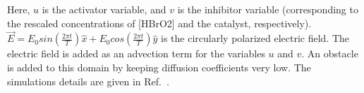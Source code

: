 Here, $u$ is the activator variable, and $v$ is the inhibitor variable (corresponding to the rescaled concentrations of [HBrO2] and the catalyst, respectively). $\vec{E} = E_{0} sin(\frac{2\pi t}{T})\hat{x} + E_{0} cos(\frac{2\pi t}{T})\hat{y}$ is the circularly polarized electric field. The electric field is added as an advection term for the variables $u$ and $v$. An obstacle is added to this domain by keeping diffusion coefficients very low. 
The simulations details are given in  Ref.~\cite{Amrutha}.


